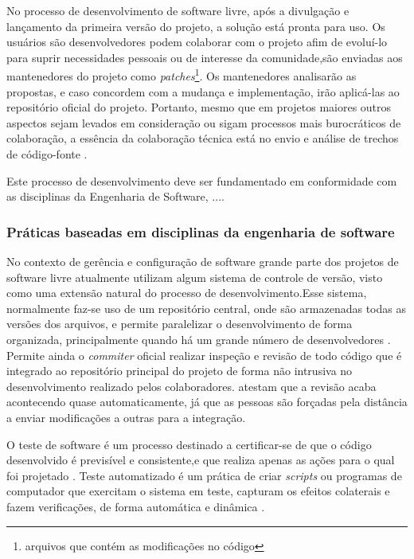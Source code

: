 No processo de desenvolvimento de software livre, após a divulgação e lançamento da primeira versão do projeto, a solução está pronta para uso. Os usuários são desenvolvedores podem colaborar com o projeto afim de evoluí-lo para suprir necessidades pessoais ou de interesse da comunidade,são enviadas aos mantenedores do projeto como \textit{patches}\footnote{arquivos que contém as modificações no código}. Os mantenedores analisarão as propostas, e caso concordem com a mudança e implementação, irão aplicá-las ao repositório oficial do projeto. Portanto, mesmo que em projetos maiores outros aspectos sejam levados em consideração ou sigam processos mais burocráticos de colaboração, a essência da colaboração técnica está no envio e análise de trechos de código-fonte \cite{meirelles2013}.

Este processo de desenvolvimento deve ser fundamentado em conformidade com as disciplinas da Engenharia de Software, ....


\subsubsection{Práticas baseadas em disciplinas da engenharia de software}


No contexto de gerência e configuração de software grande parte dos projetos de software livre atualmente utilizam algum sistema de controle de versão, visto como uma extensão natural do processo de desenvolvimento.Esse sistema, normalmente faz-se uso de um repositório central, onde são armazenadas todas as versões dos arquivos, e permite paralelizar o desenvolvimento de forma organizada, principalmente quando há um grande número de desenvolvedores \cite{reis2001caracterizaccao}. Permite ainda o \textit{commiter} oficial realizar inspeção e revisão de todo código que é integrado ao repositório principal do projeto de forma não intrusiva no desenvolvimento realizado pelos colaboradores.  atestam que a revisão acaba acontecendo quase automaticamente, já que as pessoas são forçadas pela distância a enviar modificações a outras para a integração.

O teste de software é um processo destinado a certificar-se de que o código desenvolvido é previsível e consistente,e que realiza apenas as ações para o qual foi projetado \cite{myers2011art}. Teste automatizado é um prática de criar \textit{scripts} ou programas de computador que exercitam o sistema em teste, capturam os efeitos colaterais e fazem verificações, de forma automática e dinâmica \cite{meszaros2007xunit}.

